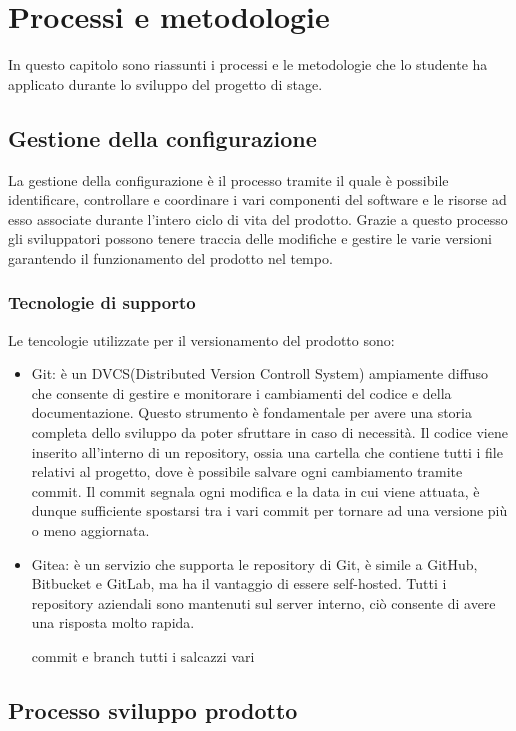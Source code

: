 \chapter{Processi e metodologie}
\label{cap:processi-metodologie}

In questo capitolo sono riassunti i processi e le metodologie che lo studente ha applicato durante lo sviluppo del progetto di stage. 

\section{Gestione della configurazione}
La gestione della configurazione è il processo tramite il quale è possibile identificare, controllare e coordinare i vari componenti del software e le risorse ad esso associate durante l'intero ciclo di vita del prodotto. Grazie a questo processo gli sviluppatori possono tenere traccia delle modifiche e gestire le varie versioni garantendo il funzionamento del prodotto nel tempo.

\subsection{Tecnologie di supporto}
Le tencologie utilizzate per il versionamento del prodotto sono:
\begin{itemize}
    \item Git: è un DVCS(Distributed Version Controll System) ampiamente diffuso che consente di gestire e monitorare i cambiamenti del codice e della documentazione. Questo strumento è fondamentale per avere una storia completa dello sviluppo da poter sfruttare in caso di necessità. Il codice viene inserito all'interno di un repository, ossia una cartella che contiene tutti i file relativi al progetto, dove è possibile salvare ogni cambiamento tramite commit. Il commit segnala ogni modifica e la data in cui viene attuata, è dunque sufficiente spostarsi tra i vari commit per tornare ad una versione più o meno aggiornata.    
    \item Gitea: è un servizio che supporta le repository di Git, è simile a GitHub, Bitbucket e GitLab, ma ha il vantaggio di essere self-hosted. 
    Tutti i repository aziendali sono mantenuti sul server interno, ciò consente di avere una risposta molto rapida.

    commit e branch tutti i salcazzi vari
\end{itemize}

\section{Processo sviluppo prodotto}



